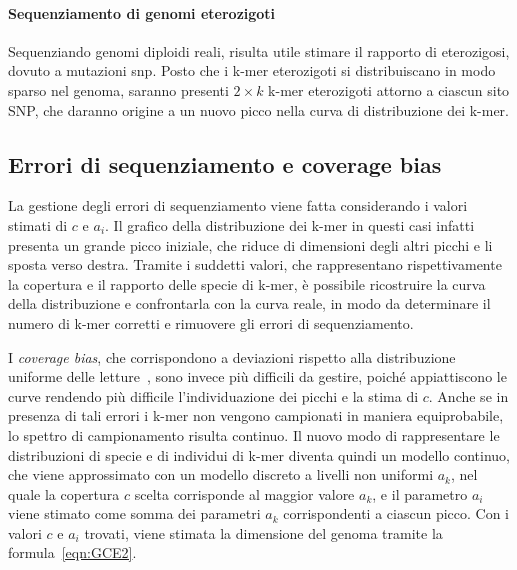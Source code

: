 \documentclass[crop=false, class=book]{standalone}
\begin{document}
	\paragraph{Sequenziamento di genomi eterozigoti}
	Sequenziando genomi diploidi reali, risulta utile stimare il rapporto di eterozigosi, dovuto a mutazioni \gls{snp}. Posto che i k-mer eterozigoti si distribuiscano in modo sparso nel genoma, saranno presenti $2\times k$ k-mer eterozigoti attorno a ciascun sito SNP, che daranno origine a un nuovo picco nella curva di distribuzione dei k-mer. 
	
	\subsection{Errori di sequenziamento e coverage bias}
	La gestione degli errori di sequenziamento viene fatta considerando i valori stimati di $c$ e $a_i$. Il grafico della distribuzione dei k-mer in questi casi infatti presenta un grande picco iniziale, che riduce di dimensioni degli altri picchi e li sposta verso destra. Tramite i suddetti valori, che rappresentano rispettivamente la copertura e il rapporto delle specie di k-mer, è possibile ricostruire la curva della distribuzione e confrontarla con la curva reale, in modo da determinare il numero di k-mer corretti e rimuovere gli errori di sequenziamento.
	
	I \textit{coverage bias}, che corrispondono a deviazioni rispetto alla distribuzione uniforme delle letture~\cite{ross2013characterizing}, sono invece più difficili da gestire, poiché appiattiscono le curve rendendo più difficile l'individuazione dei picchi e la stima di $c$. Anche se in presenza di tali errori i k-mer non vengono campionati in maniera equiprobabile, lo spettro di campionamento risulta continuo. Il nuovo modo di rappresentare le distribuzioni di specie e di individui di k-mer diventa quindi un modello continuo, che viene approssimato con un modello discreto a livelli non uniformi $a_k$, nel quale la copertura $c$ scelta corrisponde al maggior valore $a_k$, e il parametro $a_i$ viene stimato come somma dei parametri $a_k$ corrispondenti a ciascun picco. Con i valori $c$ e $a_i$ trovati, viene stimata la dimensione del genoma tramite la formula~\vref{eqn:GCE2}. 
	
	
\end{document}
